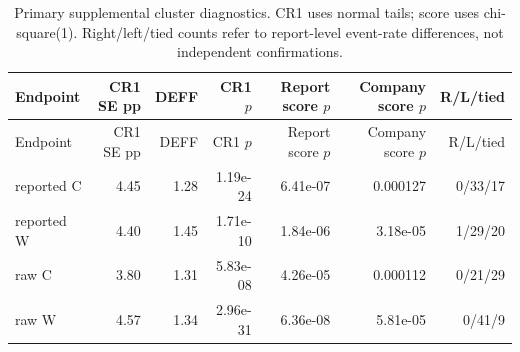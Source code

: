 {\small\setlength{\tabcolsep}{3pt}\begin{longtable}{lrrrrrr}
\caption{Primary supplemental cluster diagnostics. CR1 uses normal tails; score uses chi-square(1). Right/left/tied counts refer to report-level event-rate differences, not independent confirmations.}\\
Endpoint & CR1 SE pp & DEFF & CR1 $p$ & Report score $p$ & Company score $p$ & R/L/tied\\\toprule\endfirsthead
Endpoint & CR1 SE pp & DEFF & CR1 $p$ & Report score $p$ & Company score $p$ & R/L/tied\\\toprule\endhead
reported C & 4.45 & 1.28 & 1.19e-24 & 6.41e-07 & 0.000127 & 0/33/17\\
reported W & 4.40 & 1.45 & 1.71e-10 & 1.84e-06 & 3.18e-05 & 1/29/20\\
raw C & 3.80 & 1.31 & 5.83e-08 & 4.26e-05 & 0.000112 & 0/21/29\\
raw W & 4.57 & 1.34 & 2.96e-31 & 6.36e-08 & 5.81e-05 & 0/41/9\\
\bottomrule\end{longtable}}